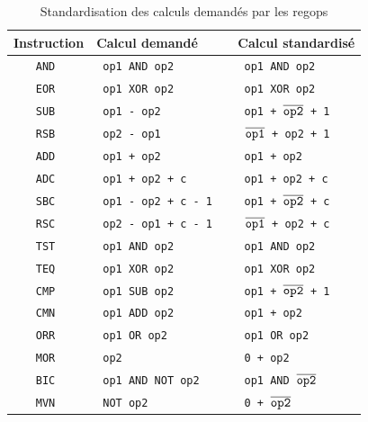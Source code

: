 \documentclass{article}
\begin{document}
\begin{table}[H]
\centering
\begingroup
\setlength{\tabcolsep}{5pt}
\renewcommand{\arraystretch}{1.1}
\begin{tabular}{ | c | l | l | }
\hline
Instruction & Calcul demandé & Calcul standardisé  \\
\hline
\tt{AND}      & \tt{ op1 AND op2 }                 & \tt{ op1 AND op2 } \\
\hline
\tt{EOR}      & \tt{ op1 XOR op2 }                 & \tt{ op1 XOR op2 } \\
\hline
\tt{SUB}      & \tt{ op1 - op2 }                   & \tt{ op1 + $\overline{\tt{op2}}$ + 1 } \\
\hline
\tt{RSB}      & \tt{ op2 - op1 }                   & \tt{ $\overline{\tt{op1}}$ + op2 + 1} \\
\hline
\tt{ADD}      & \tt{ op1 + op2 }                   & \tt{ op1 + op2 } \\
\hline
\tt{ADC}      & \tt{ op1 + op2 + c }               & \tt{ op1 + op2 + c} \\
\hline
\tt{SBC}      & \tt{ op1 - op2 + c - 1 }           & \tt{ op1 + $\overline{\tt{op2}}$ + c} \\
\hline
\tt{RSC}      & \tt{ op2 - op1 + c - 1 }           & \tt{ $\overline{\tt{op1}}$ + op2 + c} \\
\hline
\tt{TST}      & \tt{ op1 AND op2 }                 & \tt{ op1 AND op2 } \\
\hline
\tt{TEQ}      & \tt{ op1 XOR op2 }                 & \tt{ op1 XOR op2 } \\
\hline
\tt{CMP}      & \tt{ op1 SUB op2 }                 & \tt{ op1 + $\overline{\tt{op2}}$ + 1 } \\
\hline
\tt{CMN}      & \tt{ op1 ADD op2 }                 & \tt{ op1 + op2 } \\
\hline
\tt{ORR}      & \tt{ op1 OR op2 }                  & \tt{ op1 OR op2 } \\
\hline
\tt{MOR}      & \tt{ op2 }                         & \tt{ 0 + op2 } \\
\hline
\tt{BIC}      & \tt{ op1 AND NOT op2 }             & \tt{ op1 AND $\overline{\tt{op2}}$ } \\
\hline
\tt{MVN}      & \tt{ NOT op2 }                     & \tt{ 0 + $\overline{\tt{op2}}$ } \\
\hline
\end{tabular}
\endgroup
\caption{Standardisation des calculs demandés par les regops}
\label{standard}
\end{table}
\end{document}
